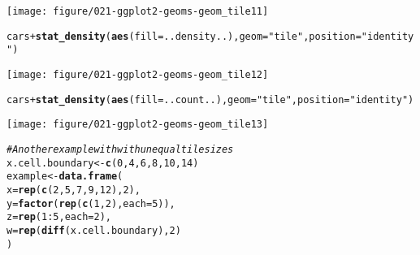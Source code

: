 \documentclass[a4paper,titlepage]{tufte-handout}\usepackage[]{graphicx}\usepackage[]{color}
\makeatletter
\def\maxwidth{ %
  \ifdim\Gin@nat@width>\linewidth
    \linewidth
  \else
    \Gin@nat@width
  \fi
}
\newcommand{\hlnum}[1]{\textcolor[rgb]{0.686,0.059,0.569}{#1}}%
\newcommand{\hlstr}[1]{\textcolor[rgb]{0.192,0.494,0.8}{#1}}%
\newcommand{\hlcom}[1]{\textcolor[rgb]{0.678,0.584,0.686}{\textit{#1}}}%
\newcommand{\hlopt}[1]{\textcolor[rgb]{0,0,0}{#1}}%
\newcommand{\hlstd}[1]{\textcolor[rgb]{0.345,0.345,0.345}{#1}}%
\newcommand{\hlkwb}[1]{\textcolor[rgb]{0.69,0.353,0.396}{#1}}%
\newcommand{\hlkwc}[1]{\textcolor[rgb]{0.333,0.667,0.333}{#1}}%
\newcommand{\hlkwd}[1]{\textcolor[rgb]{0.737,0.353,0.396}{\textbf{#1}}}%
\newenvironment{kframe}{%
 \def\at@end@of@kframe{}%
 \ifinner\ifhmode%
  \def\at@end@of@kframe{\end{minipage}}%
  \begin{minipage}{\columnwidth}%
 \fi\fi%
 \def\FrameCommand##1{\hskip\@totalleftmargin \hskip-\fboxsep
 \colorbox{shadecolor}{##1}\hskip-\fboxsep
     \hskip-\linewidth \hskip-\@totalleftmargin \hskip\columnwidth}%
 \MakeFramed {\advance\hsize-\width
   \@totalleftmargin\z@ \linewidth\hsize
   \@setminipage}}%
 {\par\unskip\endMakeFramed%
 \at@end@of@kframe}
\newenvironment{knitrout}{}{} %
\makeatother
\begin{document}
\begin{knitrout}
\begin{kframe}
{\ttfamily\noindent\itshape{}}\end{kframe}
\texttt{[image: figure/021-ggplot2-geoms-geom\_tile11]} 
\begin{kframe}\begin{alltt}
\hlstd{cars} \hlopt{+} \hlkwd{stat_density}\hlstd{(}\hlkwd{aes}\hlstd{(}\hlkwc{fill}\hlstd{=..density..),} \hlkwc{geom}\hlstd{=}\hlstr{"tile"}\hlstd{,} \hlkwc{position}\hlstd{=}\hlstr{"identity"}\hlstd{)}
\end{alltt}
\end{kframe}
\texttt{[image: figure/021-ggplot2-geoms-geom\_tile12]} 
\begin{kframe}\begin{alltt}
\hlstd{cars} \hlopt{+} \hlkwd{stat_density}\hlstd{(}\hlkwd{aes}\hlstd{(}\hlkwc{fill}\hlstd{=..count..),} \hlkwc{geom}\hlstd{=}\hlstr{"tile"}\hlstd{,} \hlkwc{position}\hlstd{=}\hlstr{"identity"}\hlstd{)}
\end{alltt}
\end{kframe}
\texttt{[image: figure/021-ggplot2-geoms-geom\_tile13]} 
\begin{kframe}\begin{alltt}
\hlcom{# Another example with with unequal tile sizes}
\hlstd{x.cell.boundary} \hlkwb{<-} \hlkwd{c}\hlstd{(}\hlnum{0}\hlstd{,} \hlnum{4}\hlstd{,} \hlnum{6}\hlstd{,} \hlnum{8}\hlstd{,} \hlnum{10}\hlstd{,} \hlnum{14}\hlstd{)}
\hlstd{example} \hlkwb{<-} \hlkwd{data.frame}\hlstd{(}
  \hlkwc{x} \hlstd{=} \hlkwd{rep}\hlstd{(}\hlkwd{c}\hlstd{(}\hlnum{2}\hlstd{,} \hlnum{5}\hlstd{,} \hlnum{7}\hlstd{,} \hlnum{9}\hlstd{,} \hlnum{12}\hlstd{),} \hlnum{2}\hlstd{),}
  \hlkwc{y} \hlstd{=} \hlkwd{factor}\hlstd{(}\hlkwd{rep}\hlstd{(}\hlkwd{c}\hlstd{(}\hlnum{1}\hlstd{,}\hlnum{2}\hlstd{),} \hlkwc{each}\hlstd{=}\hlnum{5}\hlstd{)),}
  \hlkwc{z} \hlstd{=} \hlkwd{rep}\hlstd{(}\hlnum{1}\hlopt{:}\hlnum{5}\hlstd{,} \hlkwc{each}\hlstd{=}\hlnum{2}\hlstd{),}
  \hlkwc{w} \hlstd{=} \hlkwd{rep}\hlstd{(}\hlkwd{diff}\hlstd{(x.cell.boundary),} \hlnum{2}\hlstd{)}
\hlstd{)}


\end{alltt}
\end{kframe}
\end{knitrout}
\end{document}
